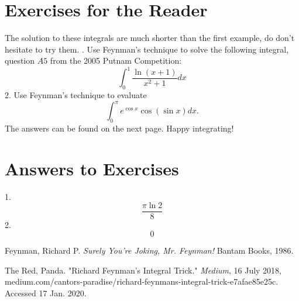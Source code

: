 \documentclass{article}
\begin{document}
\section*{Exercises for the Reader}
The solution to these integrals are much shorter than the first example, do don't hesitate to try them.
\newline {}. Use Feynman's technique to solve the following integral, question $A5$ from the 2005 Putnam Competition:
$$\int_{0}^{1}\frac{\ln(x+1)}{x^2+1}dx$$
2. Use Feynman's technique to evaluate
$$\int_{0}^{\pi}e^{\cos{x}}\cos{(\sin{x})}dx.$$
The answers can be found on the next page. Happy integrating!
\newpage
\section*{Answers to Exercises}
1. $$\frac{\pi\ln{2}}{8}$$
2. $$0$$
\begin{thebibliography}{2}
Feynman, Richard P.
\textit{Surely You're Joking, Mr. Feynman!}
Bantam Books, 1986.

The Red, Panda. "Richard Feynman's Integral Trick." 
\textit{Medium}, 16 July 2018, medium.com/cantors-paradise/richard-feynmans-integral-trick-e7afae85e25c. Accessed 17 Jan. 2020.
\end{thebibliography}
\end{document}
